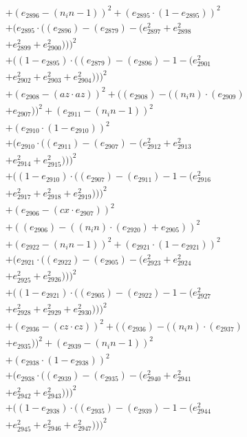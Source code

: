 \documentclass[10pt, a4paper]{article}
\begin{document}
\begin{small}
\begin{align*}
& + (e_{2896} - (n_in - 1))^{2} + (e_{2895}  \cdot  (1 - e_{2895}))^{2} \\
& + (e_{2895}  \cdot  ((e_{2896}) - (e_{2879}) - (e_{2897}^{2} + e_{2898}^{2} \\
& + e_{2899}^{2} + e_{2900}^{2})))^{2} \\
& + ((1 - e_{2895})  \cdot  ((e_{2879}) - (e_{2896}) - 1 - (e_{2901}^{2} \\
& + e_{2902}^{2} + e_{2903}^{2} + e_{2904}^{2})))^{2} \\
& + (e_{2908} - (az  \cdot  az))^{2} + ((e_{2908}) - ((n_in)  \cdot  (e_{2909}) \\
& + e_{2907}))^{2} + (e_{2911} - (n_in - 1))^{2} \\
& + (e_{2910}  \cdot  (1 - e_{2910}))^{2} \\
& + (e_{2910}  \cdot  ((e_{2911}) - (e_{2907}) - (e_{2912}^{2} + e_{2913}^{2} \\
& + e_{2914}^{2} + e_{2915}^{2})))^{2} \\
& + ((1 - e_{2910})  \cdot  ((e_{2907}) - (e_{2911}) - 1 - (e_{2916}^{2} \\
& + e_{2917}^{2} + e_{2918}^{2} + e_{2919}^{2})))^{2} \\
& + (e_{2906} - (cx  \cdot  e_{2907}))^{2} \\
& + ((e_{2906}) - ((n_in)  \cdot  (e_{2920}) + e_{2905}))^{2} \\
& + (e_{2922} - (n_in - 1))^{2} + (e_{2921}  \cdot  (1 - e_{2921}))^{2} \\
& + (e_{2921}  \cdot  ((e_{2922}) - (e_{2905}) - (e_{2923}^{2} + e_{2924}^{2} \\
& + e_{2925}^{2} + e_{2926}^{2})))^{2} \\
& + ((1 - e_{2921})  \cdot  ((e_{2905}) - (e_{2922}) - 1 - (e_{2927}^{2} \\
& + e_{2928}^{2} + e_{2929}^{2} + e_{2930}^{2})))^{2} \\
& + (e_{2936} - (cz  \cdot  cz))^{2} + ((e_{2936}) - ((n_in)  \cdot  (e_{2937}) \\
& + e_{2935}))^{2} + (e_{2939} - (n_in - 1))^{2} \\
& + (e_{2938}  \cdot  (1 - e_{2938}))^{2} \\
& + (e_{2938}  \cdot  ((e_{2939}) - (e_{2935}) - (e_{2940}^{2} + e_{2941}^{2} \\
& + e_{2942}^{2} + e_{2943}^{2})))^{2} \\
& + ((1 - e_{2938})  \cdot  ((e_{2935}) - (e_{2939}) - 1 - (e_{2944}^{2} \\
& + e_{2945}^{2} + e_{2946}^{2} + e_{2947}^{2})))^{2} \\

\end{align*}
\end{small}
\end{document}
